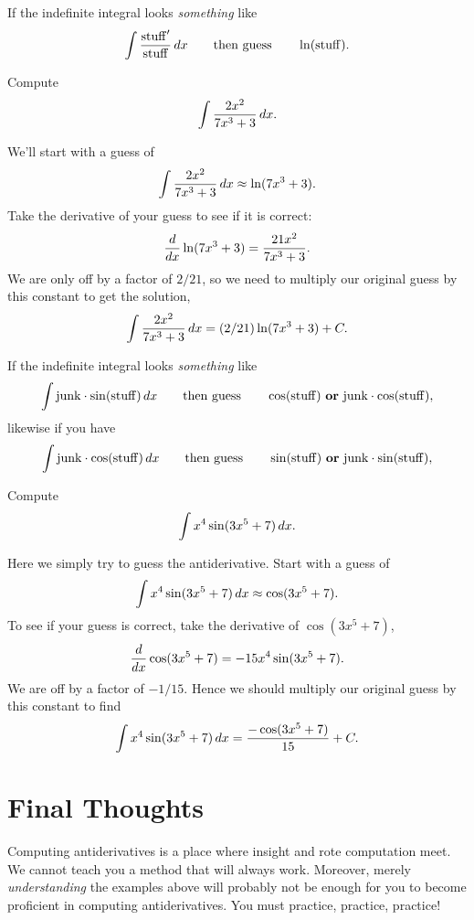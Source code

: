 \documentclass{ximera}
\begin{document}
\begin{template}\label{template:lnchain}
If the indefinite integral looks \emph{something} like
\[
\int \frac{\mathrm{stuff}'}{\mathrm{stuff}}\,d x \qquad\text{then guess}\qquad\ln(\mathrm{stuff}).
\]
\end{template}

\begin{example}
Compute
\[
\int \frac{2x^2}{7x^3 + 3} \,d x.
\]


We'll start with a guess of
\[
\int \frac{2x^2}{7x^3 + 3} \,d x \approx \ln(7x^3+3).
\]
Take the derivative of your guess to see if it is correct:
\[
\frac{d}{dx} \ln(7x^3+3) = \frac{21x^2}{7x^3 + 3}.
\]
We are only off by a factor of $2/21$, so we need to multiply our
original guess by this constant to get the solution,
\[
\int \frac{2x^2}{7x^3 + 3} \,d x = (2/21)\ln(7x^3+3)+C.
\]
\end{example}




\begin{template}\label{template:trigchain}
If the indefinite integral looks \emph{something} like
\[
\int \mathrm{junk}\cdot \sin(\mathrm{stuff}) \,d x \qquad\text{then
  guess}\qquad \cos(\mathrm{stuff}) \text{ \textbf{or} }\mathrm{junk}
\cdot \cos(\mathrm{stuff}),
\]
likewise if you have 
\[
\int \mathrm{junk}\cdot \cos(\mathrm{stuff}) \,d x \qquad\text{then
  guess}\qquad \sin(\mathrm{stuff}) \text{ \textbf{or} }\mathrm{junk}
\cdot \sin(\mathrm{stuff}),
\]
\end{template}



\begin{example}
Compute
\[
\int x^4\sin(3x^5+7) \,d x.
\]



Here we simply try to guess the antiderivative. Start with a guess of
\[
\int x^4\sin(3x^5+7)\,d x \approx \cos(3x^5+7).
\]
To see if your guess is correct, take the derivative of $\cos(3x^5+7)$,
\[
\frac{d}{dx} \cos(3x^5+7) = -15x^4\sin(3x^5+7).
\]
We are off by a factor of $-1/15$. Hence we should multiply our
original guess by this constant to find
\[
\int x^4\sin(3x^5+7) \,d x = \frac{-\cos(3x^5+7)}{15} + C.
\]
\end{example}





\section{Final Thoughts}
Computing antiderivatives is a place where insight and rote
computation meet. We cannot teach you a method that will always
work. Moreover, merely \emph{understanding} the examples above will
probably not be enough for you to become proficient in computing
antiderivatives. You must practice, practice, practice!
\end{document}
